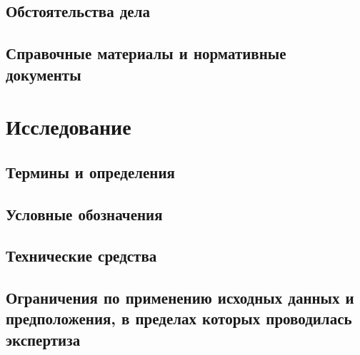 \documentclass[a4paper,12pt]{report}
\begin{document}
\subsection{Обстоятельства дела}


\subsection{Справочные материалы и нормативные документы}



\section{Исследование}


\subsection{Термины и определения}


\subsection{Условные обозначения}


\subsection{Технические средства}


\subsection{Ограничения по применению исходных данных и предположения, в пределах которых проводилась экспертиза}






\end{document}
